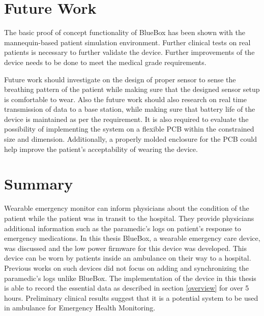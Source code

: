 \section{Future Work}
The basic proof of concept functionality of BlueBox has been shown with the mannequin-based patient simulation environment. Further clinical tests on real patients is necessary to further validate the device. Further improvements of the device needs to be done to meet the medical grade requirements.

\hspace{10mm}Future work should investigate on the design of proper sensor to sense the breathing pattern of the patient while making sure that the designed sensor setup is comfortable to wear. Also the future work should also research on real time transmission of data to a base station, while making sure that battery life of the device is maintained as per the requirement. It is also required to evaluate the possibility of implementing the system on a flexible PCB within the constrained size and dimension. Additionally, a properly molded enclosure for the PCB could help improve the patient's acceptability of wearing the device. 
\section{Summary}
Wearable emergency monitor can inform physicians about the condition of the patient while the patient was in transit to the hospital. They provide physicians additional information such as the paramedic's logs on patient's response to emergency medications. In this thesis BlueBox, a wearable emergency care device, was discussed and the low power firmware for this device was developed. This device can be worn by patients inside an ambulance on their way to a hospital. Previous works on such devices did not focus on adding and synchronizing the paramedic's logs unlike BlueBox. The implementation of the device in this thesis is able to record the essential data as described in section \ref{overview} for over 5 hours. Preliminary clinical results suggest that it is a potential system to be used in ambulance for Emergency Health Monitoring.